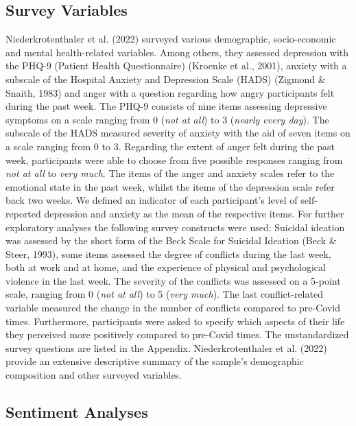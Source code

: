 \documentclass[
  english,
  jou,floatsintext]{apa7}
\begin{document}
\hypertarget{survey-variables}{%
\subsection{Survey Variables}\label{survey-variables}}

Niederkrotenthaler et al. (2022) surveyed various demographic, socio-economic and mental health-related variables.
Among others, they assessed depression with the PHQ-9 (Patient Health Questionnaire) (Kroenke et al., 2001), anxiety with a subscale of the Hospital Anxiety and Depression Scale (HADS) (Zigmond \& Snaith, 1983) and anger with a question regarding how angry participants felt during the past week. The PHQ-9 consists of nine items assessing depressive symptoms on a scale ranging from 0 (\emph{not at all}) to 3 (\emph{nearly every day}). The subscale of the HADS measured severity of anxiety with the aid of seven items on a scale ranging from 0 to 3. Regarding the extent of anger felt during the past week, participants were able to choose from five possible responses ranging from \emph{not at all} to \emph{very much}. The items of the anger and anxiety scales refer to the emotional state in the past week, whilst the items of the depression scale refer back two weeks. We defined an indicator of each participant's level of self-reported depression and anxiety as the mean of the respective items.
For further exploratory analyses the following survey constructs were used:
Suicidal ideation was assessed by the short form of the Beck Scale for Suicidal Ideation (Beck \& Steer, 1993), some items assessed the degree of conflicts during the last week, both at work and at home, and the experience of physical and psychological violence in the last week. The severity of the conflicts was assessed on a 5-point scale, ranging from 0 (\emph{not at all}) to 5 (\emph{very much}). The last conflict-related variable measured the change in the number of conflicts compared to pre-Covid times. Furthermore, participants were asked to specify which aspects of their life they perceived more positively compared to pre-Covid times.
The unstandardized survey questions are listed in the Appendix.
Niederkrotenthaler et al. (2022) provide an extensive descriptive summary of the sample's demographic composition and other surveyed variables.

\hypertarget{sentiment-analyses}{%
\subsection{Sentiment Analyses}\label{sentiment-analyses}}
\end{document}
